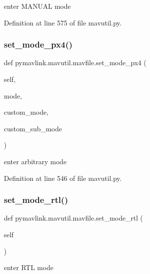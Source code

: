 \begin{DoxyVerb}enter MANUAL mode\end{DoxyVerb}
 

Definition at line 575 of file mavutil.\+py.

\mbox{\label{classpymavlink_1_1mavutil_1_1mavfile_aa555cab4483c90f63af193958fa49204}} 
\subsubsection{\texorpdfstring{set\_mode\_px4()}{set\_mode\_px4()}}
{\footnotesize\ttfamily def pymavlink.\+mavutil.\+mavfile.\+set\+\_\+mode\+\_\+px4 (\begin{DoxyParamCaption}\item[{}]{self,  }\item[{}]{mode,  }\item[{}]{custom\+\_\+mode,  }\item[{}]{custom\+\_\+sub\+\_\+mode }\end{DoxyParamCaption})}

\begin{DoxyVerb}enter arbitrary mode\end{DoxyVerb}
 

Definition at line 546 of file mavutil.\+py.

\mbox{\label{classpymavlink_1_1mavutil_1_1mavfile_a6fda4c34e34cccf12e9a34e6103e1678}} 
\subsubsection{\texorpdfstring{set\_mode\_rtl()}{set\_mode\_rtl()}}
{\footnotesize\ttfamily def pymavlink.\+mavutil.\+mavfile.\+set\+\_\+mode\+\_\+rtl (\begin{DoxyParamCaption}\item[{}]{self }\end{DoxyParamCaption})}

\begin{DoxyVerb}enter RTL mode\end{DoxyVerb}
 

